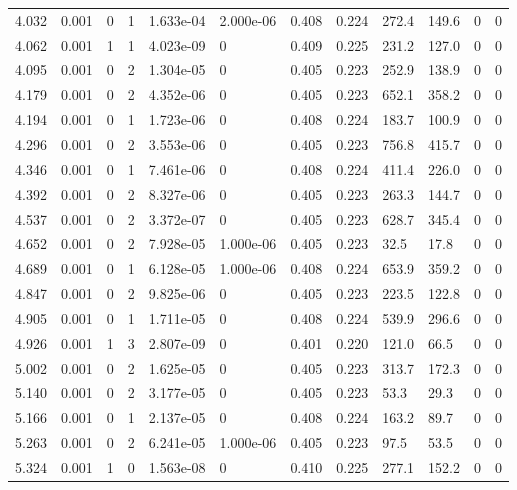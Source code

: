 \documentclass[preview]{standalone}
\begin{document}
{{{\begin{tabular}{L{1.2cm}C{1.2cm} C{0.3cm}C{0.5cm} C{1.4cm}C{1.4cm} C{1.4cm}C{1.4cm} C{1.6cm}C{1.6cm} C{1.6cm}C{1.6cm}}
  4.032  &  0.001  & 0     &  1 &  1.633e-04  & 2.000e-06  &  0.408&   0.224& 272.4 & 149.6   &  0 & 0  \\ 
  4.062  &  0.001  & 1     &  1 &  4.023e-09  & 0  &  0.409&   0.225& 231.2 & 127.0   &  0 & 0  \\ 
  4.095  &  0.001  & 0     &  2 &  1.304e-05  & 0  &  0.405&   0.223& 252.9 & 138.9   &  0 & 0  \\ 
  4.179  &  0.001  & 0     &  2 &  4.352e-06  & 0  &  0.405&   0.223& 652.1 & 358.2   &  0 & 0  \\ 
  4.194  &  0.001  & 0     &  1 &  1.723e-06  & 0  &  0.408&   0.224& 183.7 & 100.9   &  0 & 0  \\ 
  4.296  &  0.001  & 0     &  2 &  3.553e-06  & 0  &  0.405&   0.223& 756.8 & 415.7   &  0 & 0  \\ 
  4.346  &  0.001  & 0     &  1 &  7.461e-06  & 0  &  0.408&   0.224& 411.4 & 226.0   &  0 & 0  \\ 
  4.392  &  0.001  & 0     &  2 &  8.327e-06  & 0  &  0.405&   0.223& 263.3 & 144.7   &  0 & 0  \\ 
  4.537  &  0.001  & 0     &  2 &  3.372e-07  & 0  &  0.405&   0.223& 628.7 & 345.4   &  0 & 0  \\ 
  4.652  &  0.001  & 0     &  2 &  7.928e-05  & 1.000e-06  &  0.405&   0.223& 32.5 & 17.8   &  0 & 0  \\ 
  4.689  &  0.001  & 0     &  1 &  6.128e-05  & 1.000e-06  &  0.408&   0.224& 653.9 & 359.2   &  0 & 0  \\ 
  4.847  &  0.001  & 0     &  2 &  9.825e-06  & 0  &  0.405&   0.223& 223.5 & 122.8   &  0 & 0  \\ 
  4.905  &  0.001  & 0     &  1 &  1.711e-05  & 0  &  0.408&   0.224& 539.9 & 296.6   &  0 & 0  \\ 
  4.926  &  0.001  & 1     &  3 &  2.807e-09  & 0  &  0.401&   0.220& 121.0 & 66.5   &  0 & 0  \\ 
  5.002  &  0.001  & 0     &  2 &  1.625e-05  & 0  &  0.405&   0.223& 313.7 & 172.3   &  0 & 0  \\ 
  5.140  &  0.001  & 0     &  2 &  3.177e-05  & 0  &  0.405&   0.223& 53.3 & 29.3   &  0 & 0  \\ 
  5.166  &  0.001  & 0     &  1 &  2.137e-05  & 0  &  0.408&   0.224& 163.2 & 89.7   &  0 & 0  \\ 
  5.263  &  0.001  & 0     &  2 &  6.241e-05  & 1.000e-06  &  0.405&   0.223& 97.5 & 53.5   &  0 & 0  \\ 
  5.324  &  0.001  & 1     &  0 &  1.563e-08  & 0  &  0.410&   0.225& 277.1 & 152.2   &  0 & 0  \\ 

\end{tabular}}}}
\end{document}
